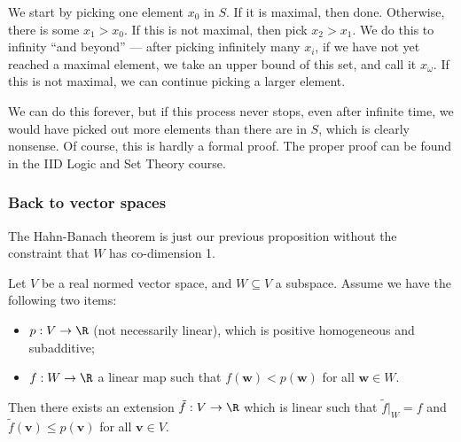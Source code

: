 \documentclass[a4paper]{article}
\begin{document}
We start by picking one element $x_0$ in $S$. If it is maximal, then done. Otherwise, there is some $x_1 > x_0$. If this is not maximal, then pick $x_2 > x_1$. We do this to infinity ``and beyond'' --- after picking infinitely many $x_i$, if we have not yet reached a maximal element, we take an upper bound of this set, and call it $x_\omega$. If this is not maximal, we can continue picking a larger element.

We can do this forever, but if this process never stops, even after infinite time, we would have picked out more elements than there are in $S$, which is clearly nonsense. Of course, this is hardly a formal proof. The proper proof can be found in the IID Logic and Set Theory course.

\subsubsection*{Back to vector spaces}
The Hahn-Banach theorem is just our previous proposition without the constraint that $W$ has co-dimension 1.
\begin{thm}
  Let $V$ be a real normed vector space, and $W\subseteq V$ a subspace. Assume we have the following two items:
  \begin{itemize}
    \item $p: V \to \R$ (not necessarily linear), which is positive homogeneous and subadditive;
    \item $f: W \to \R$ a linear map such that $f(\mathbf{w}) < p (\mathbf{w})$ for all $\mathbf{w}\in W$.
  \end{itemize}
  Then there exists an extension $\tilde{f}: V\to \R$ which is linear such that $\tilde{f}|_{W} = f$ and $\tilde{f}(\mathbf{v}) \leq p(\mathbf{v})$ for all $\mathbf{v}\in V$.
\end{thm}
\end{document}
